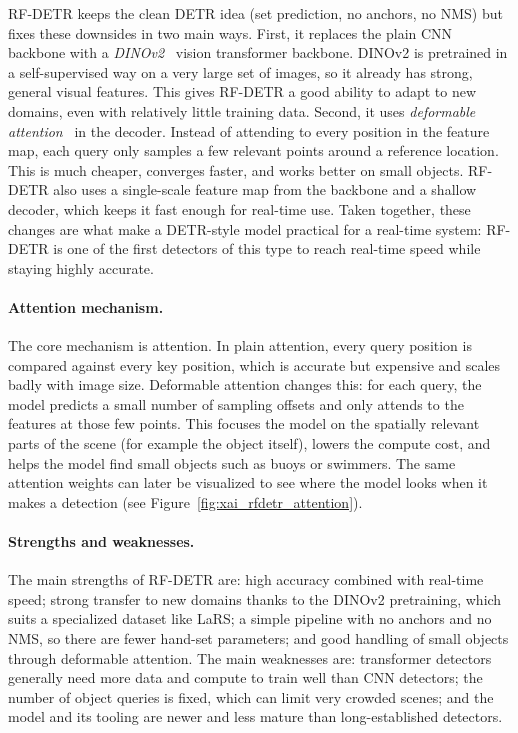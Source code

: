 \documentclass[11pt,a4paper]{article}
\begin{document}
RF-DETR keeps the clean DETR idea (set prediction, no anchors, no NMS) but fixes
these downsides in two main ways. First, it replaces the plain CNN backbone with
a \emph{DINOv2}~\cite{oquab2023dinov2} vision transformer backbone. DINOv2 is
pretrained in a self-supervised way on a very large set of images, so it already
has strong, general visual features. This gives RF-DETR a good ability to adapt
to new domains, even with relatively little training data. Second, it uses
\emph{deformable attention}~\cite{zhu2021deformable} in the decoder. Instead of
attending to every position in the feature map, each query only samples a few
relevant points around a reference location. This is much cheaper, converges
faster, and works better on small objects. RF-DETR also uses a single-scale
feature map from the backbone and a shallow decoder, which keeps it fast enough
for real-time use. Taken together, these changes are what make a DETR-style model
practical for a real-time system: RF-DETR is one of the first detectors of this
type to reach real-time speed while staying highly accurate.

\paragraph{Attention mechanism.}
The core mechanism is attention. In plain attention, every query position is
compared against every key position, which is accurate but expensive and scales
badly with image size. Deformable attention changes this: for each query, the
model predicts a small number of sampling offsets and only attends to the
features at those few points. This focuses the model on the spatially relevant
parts of the scene (for example the object itself), lowers the compute cost, and
helps the model find small objects such as buoys or swimmers. The same
attention weights can later be visualized to see where the model looks when it
makes a detection (see Figure~\ref{fig:xai_rfdetr_attention}).

\paragraph{Strengths and weaknesses.}
The main strengths of RF-DETR are: high accuracy combined with real-time speed;
strong transfer to new domains thanks to the DINOv2 pretraining, which suits a
specialized dataset like LaRS; a simple pipeline with no anchors and no NMS, so
there are fewer hand-set parameters; and good handling of small objects through
deformable attention. The main weaknesses are: transformer detectors generally
need more data and compute to train well than CNN detectors; the number of object
queries is fixed, which can limit very crowded scenes; and the model and its
tooling are newer and less mature than long-established detectors.
\end{document}
